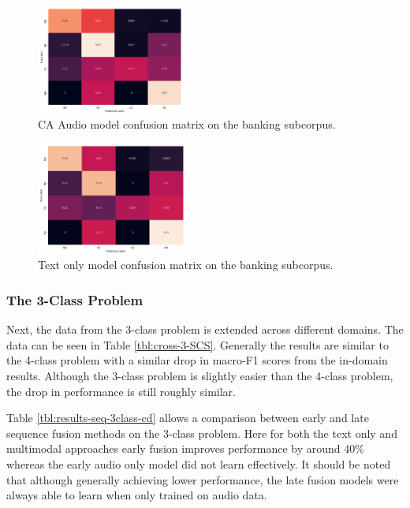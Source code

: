 \documentclass[twocolumn]{article}
\begin{document}
\begin{figure}[H]
\centering
\includegraphics[width=5cm]{ca-audio-conf-mat-4class-banking}
\caption{CA Audio model confusion matrix on the banking subcorpus.\label{fig:res-cd-ca-banking}}
\end{figure}

\begin{figure}[H]
\centering
\includegraphics[width=5cm]{text-only-conf-mat-4class-banking}
\caption{Text only model confusion matrix on the banking subcorpus.\label{fig:res-cd-text-banking}}
\end{figure}

\subsubsection{The 3-Class Problem}\label{sec:cd-3class}


Next, the data from the 3-class problem is extended across different
domains. The data can be seen in Table \ref{tbl:cross-3-SCS}. Generally
the results are similar to the 4-class problem with a similar drop in
macro-F1 scores from the in-domain results. Although the 3-class problem
is slightly easier than the 4-class problem, the drop in performance is
still roughly similar.

Table \ref{tbl:results-seq-3class-cd} allows a comparison between early
and late sequence fusion methods on the 3-class problem. Here for both
the text only and multimodal approaches early fusion improves
performance by around 40\% whereas the early audio only model did not
learn effectively. It should be noted that although generally achieving
lower performance, the late fusion models were always able to learn when
only trained on audio data.
\end{document}
